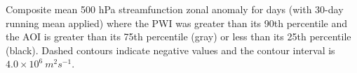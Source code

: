 \label{fig:sam_composite}
Composite mean 500 hPa streamfunction zonal anomaly for days (with 30-day running mean applied) where the PWI was greater than its 90th percentile and the AOI is greater than its 75th percentile (gray) or less than its 25th percentile (black). Dashed contours indicate negative values and the contour interval is $4.0 \times 10^6 \: m^2 s^{-1}$. 
    